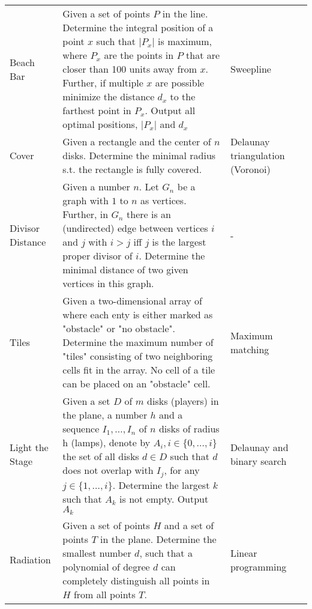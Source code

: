 \documentclass[a4paper, 10pt]{article}
\begin{document}
\begin{longtable}{ L{2cm} L{8cm} L{4cm} r}
        Beach Bar 
        & Given a set of points $P$ in the line. 
            Determine the integral position of a point $x$ such that $|P_x|$ is maximum, 
            where $P_x$ are the points in $P$ that are closer than 100 units away from $x$.
            Further, if multiple $x$ are possible minimize the distance $d_x$ to the farthest point in $P_x$. 
            Output all optimal positions, $|P_x|$ and $d_x$  
        & Sweepline &  \pageref{sec:beach_bar} \\

        Cover 
        & Given a rectangle and the center of $n$ disks. Determine the minimal radius s.t. the rectangle is fully covered.
        & Delaunay triangulation (Voronoi) &  \pageref{sec:cover} \\

        Divisor Distance 
        & Given a number $n$. Let $G_n$ be a graph with $1$ to $n$ as vertices. Further, in $G_n$ there is an (undirected) 
            edge between vertices $i$ and $j$ with $i>j$ iff $j$ is the largest proper divisor of $i$. 
            Determine the minimal distance of two given vertices in this graph.
        & - &  \pageref{sec:divisor_distance} \\

        Tiles 
        & Given a two-dimensional array of where each enty is either marked as "obstacle" or "no obstacle". 
            Determine the maximum number of "tiles" consisting of two neighboring cells fit in the array. 
            No cell of a tile can be placed on an "obstacle" cell. 
            & Maximum matching &  \pageref{sec:tiles} \\

        Light the Stage 
        & Given a set $D$ of $m$ disks (players) in the plane, a number $h$ and a sequence $I_1,\dots,I_n$ 
            of $n$ disks of radius h (lamps), denote by $A_i, i\in \{0,\dots,i\}$ the set of all disks $d\in D$ 
            such that $d$ does not overlap with $I_j$, for any $j\in \{1,\dots,i\}$.
            Determine the largest $k$ such that $A_k$ is not empty. Output $A_k$
            & Delaunay and binary search &  \pageref{sec:light_the_stage} \\

        Radiation 
        & Given a set of points $H$ and a set of points $T$ in the plane. Determine the smallest number $d$, such that a polynomial 
            of degree $d$ can completely distinguish all points in $H$ from all points $T$.
            & Linear programming &  \pageref{sec:radiation} \\


\end{longtable}
\end{document}
